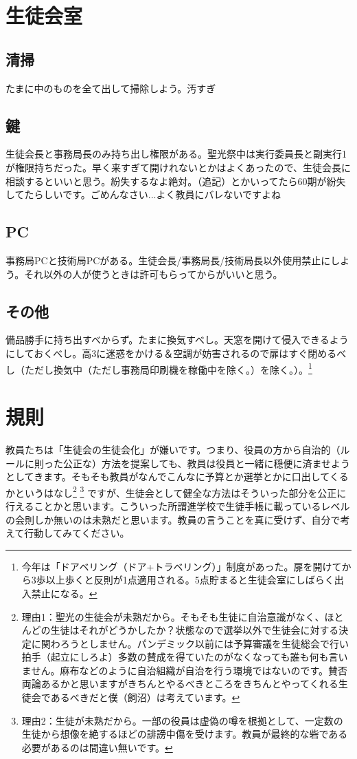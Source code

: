 \documentclass[a4paper]{ltjsreport}
\begin{document}
\section{生徒会室}
\subsection{清掃}
たまに中のものを全て出して掃除しよう。汚すぎ
\subsection{鍵}
生徒会長と事務局長のみ持ち出し権限がある。聖光祭中は実行委員長と副実行1が権限持ちだった。早く来すぎて開けれないとかはよくあったので、生徒会長に相談するといいと思う。紛失するなよ絶対。（追記）とかいってたら60期が紛失してたらしいです。ごめんなさい...よく教員にバレないですよね
\subsection{PC}
事務局PCと技術局PCがある。生徒会長/事務局長/技術局長以外使用禁止にしよう。それ以外の人が使うときは許可もらってからがいいと思う。
\subsection{その他}
備品勝手に持ち出すべからず。たまに換気すべし。天窓を開けて侵入できるようにしておくべし。高3に迷惑をかける＆空調が妨害されるので扉はすぐ閉めるべし（ただし換気中（ただし事務局印刷機を稼働中を除く。）を除く。）。\footnote{今年は「ドアベリング（ドア+トラベリング）」制度があった。扉を開けてから3歩以上歩くと反則が1点適用される。5点貯まると生徒会室にしばらく出入禁止になる。}
\section{規則}
教員たちは「生徒会の生徒会化」が嫌いです。つまり、役員の方から自治的（ルールに則った公正な）方法を提案しても、教員は役員と一緒に穏便に済ませようとしてきます。そもそも教員がなんでこんなに予算とか選挙とかに口出してくるかというはなし\footnote{理由1：聖光の生徒会が未熟だから。そもそも生徒に自治意識がなく、ほとんどの生徒はそれがどうかしたか？状態なので選挙以外で生徒会に対する決定に関わろうとしません。パンデミック以前には予算審議を生徒総会で行い拍手（起立にしろよ）多数の賛成を得ていたのがなくなっても誰も何も言いません。麻布などのように自治組織が自治を行う環境ではないのです。賛否両論あるかと思いますがきちんとやるべきところをきちんとやってくれる生徒会であるべきだと僕（飼沼）は考えています。} \footnote{理由2：生徒が未熟だから。一部の役員は虚偽の噂を根拠として、一定数の生徒から想像を絶するほどの誹謗中傷を受けます。教員が最終的な砦である必要があるのは間違い無いです。} ですが、生徒会として健全な方法はそういった部分を公正に行えることかと思います。こういった所謂進学校で生徒手帳に載っているレベルの会則しか無いのは未熟だと思います。教員の言うことを真に受けず、自分で考えて行動してみてください。
\end{document}
